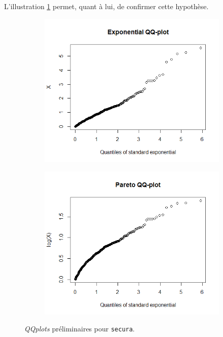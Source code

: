 		L'illustration \ref{QQPlot_Expo_Secura} permet, quant à lui, de confirmer cette hypothèse.
		
		\begin{figure}[H]
			\begin{center}
				\begin{subfigure}[b]{0.45\textwidth}
					\includegraphics[scale=0.43]{Graphiques/QQPlot_Expo_Secura} 
					\caption{} \label{QQPlot_Expo_Secura}
				\end{subfigure}
				\begin{subfigure}[b]{0.4\textwidth}
					\includegraphics[scale=0.43]{Graphiques/QQplot_Pareto_Secura} 
					\caption{} \label{QQplot_Pareto_Secura}
				\end{subfigure}
				\renewcommand{\figurename}{Illustration}
				\caption{\textit{QQplots} préliminaires pour \texttt{secura}.}
			\end{center}
		\end{figure}
		
